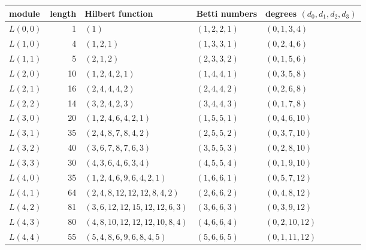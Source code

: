 \begin{tabular}{@{}lrlll@{}}
\toprule
module & length & Hilbert function & Betti numbers & degrees $(d_0,d_1,d_2,d_3)$\\
\midrule
$L(0,0)$ & 1 & $(1)$ & $(1,2,2,1)$ & $(0,1,3,4)$\\
$L(1,0)$ & 4 & $(1,2,1)$ & $(1,3,3,1)$ & $(0,2,4,6)$\\
$L(1,1)$ & 5 & $(2,1,2)$ & $(2,3,3,2)$ & $(0,1,5,6)$\\
$L(2,0)$ & 10 & $(1,2,4,2,1)$ & $(1,4,4,1)$ & $(0,3,5,8)$\\
$L(2,1)$ & 16 & $(2,4,4,4,2)$ & $(2,4,4,2)$ & $(0,2,6,8)$\\
$L(2,2)$ & 14 & $(3,2,4,2,3)$ & $(3,4,4,3)$ & $(0,1,7,8)$\\
$L(3,0)$ & 20 & $(1,2,4,6,4,2,1)$ & $(1,5,5,1)$ & $(0,4,6,10)$\\
$L(3,1)$ & 35 & $(2,4,8,7,8,4,2)$ & $(2,5,5,2)$ & $(0,3,7,10)$\\
$L(3,2)$ & 40 & $(3,6,7,8,7,6,3)$ & $(3,5,5,3)$ & $(0,2,8,10)$\\
$L(3,3)$ & 30 & $(4,3,6,4,6,3,4)$ & $(4,5,5,4)$ & $(0,1,9,10)$\\
$L(4,0)$ & 35 & $(1,2,4,6,9,6,4,2,1)$ & $(1,6,6,1)$ & $(0,5,7,12)$\\
$L(4,1)$ & 64 & $(2,4,8,12,12,12,8,4,2)$ & $(2,6,6,2)$ & $(0,4,8,12)$\\
$L(4,2)$ & 81 & $(3,6,12,12,15,12,12,6,3)$ & $(3,6,6,3)$ & $(0,3,9,12)$\\
$L(4,3)$ & 80 & $(4,8,10,12,12,12,10,8,4)$ & $(4,6,6,4)$ & $(0,2,10,12)$\\
$L(4,4)$ & 55 & $(5,4,8,6,9,6,8,4,5)$ & $(5,6,6,5)$ & $(0,1,11,12)$\\
\bottomrule
\end{tabular}
